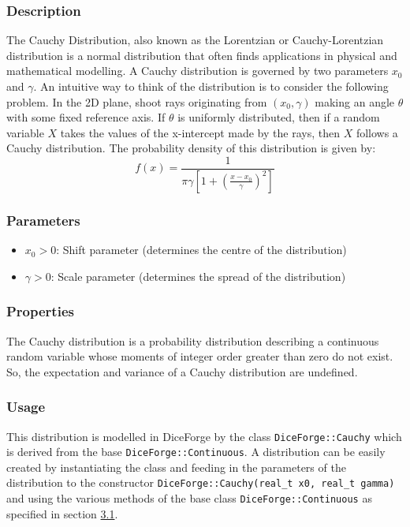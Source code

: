 \documentclass[titlepage, 11pt]{article}
\newcommand{\code}[1]
{\colorbox{light-gray}{\texttt{#1}}}
\begin{document}
\subsubsection{Description}
The Cauchy Distribution, also known as the Lorentzian or Cauchy-Lorentzian distribution is a normal distribution that often finds applications in physical and mathematical modelling. A Cauchy distribution is governed by two parameters $x_0$ and $\gamma$. An intuitive way to think of the distribution is to consider the following problem. 
\newline
\newline
In the 2D plane, shoot rays originating from $(x_0, \gamma)$ making an angle $\theta$ with some fixed reference axis. If $\theta$ is uniformly distributed, then if a random variable $X$ takes the values of the x-intercept made by the rays, then $X$ follows a Cauchy distribution.
The probability density of this distribution is given by:
\begin{equation}
f(x) = \frac{1}{\pi\gamma\left[1 + (\frac{x-x_0}{\gamma})^2\right]}
\end{equation}
\subsubsection{Parameters}
\begin{itemize}
    \item $x_0 > 0$: Shift parameter (determines the centre of the distribution)
    \item $\gamma > 0$: Scale parameter (determines the spread of the distribution)
\end{itemize}

\subsubsection{Properties}
The Cauchy distribution is a probability distribution describing a continuous random variable whose moments of integer order greater than zero do not exist.
So, the expectation and variance of a Cauchy distribution are undefined.
\subsubsection{Usage}
This distribution is modelled in DiceForge by the class \code{DiceForge::Cauchy} which is derived from the base \code{DiceForge::Continuous}. A distribution can be easily created by instantiating the class and feeding in the parameters of the distribution to the constructor 
\code{DiceForge::Cauchy(real\_t x0, real\_t gamma)} and using the various methods of the base class \code{DiceForge::Continuous} as  specified in section \hyperref[sec:3.1]{3.1}.\newline
\end{document}

